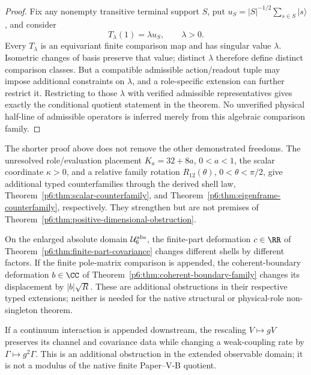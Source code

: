 \documentclass[12pt,a4paper]{article}
\newcommand{\Uabs}{\mathcal U_6^{\rm abs}}
\begin{document}
\begin{proof}
Fix any nonempty transitive terminal support \(S\), put
\(u_S=|S|^{-1/2}\sum_{s\in S}|s\rangle\), and consider
\[
T_\lambda(1)=\lambda u_S,
\qquad \lambda>0.
\]
Every \(T_\lambda\) is an equivariant finite comparison map and has
singular value \(\lambda\). Isometric changes of basis preserve that
value; distinct \(\lambda\) therefore define distinct comparison
classes. But a compatible admissible action/readout tuple may impose
additional constraints on \(\lambda\), and a role-specific extension
can further restrict it. Restricting to those \(\lambda\) with verified
admissible representatives gives exactly the conditional quotient statement
in the theorem. No unverified physical half-line of admissible operators is
inferred merely from this algebraic comparison family.
\end{proof}

\begin{corollary}
\label{p6:cor:additional-obstruction-witnesses}
The shorter proof above does not remove the other demonstrated freedoms.  The
unresolved role/evaluation placement
\(K_a=32+8a\), \(0<a<1\), the scalar coordinate \(\kappa>0\), and a relative
family rotation \(R_{12}(\theta)\), \(0<\theta<\pi/2\), give additional typed
counterfamilies through the derived shell law,
Theorem~\ref{p6:thm:scalar-counterfamily}, and
Theorem~\ref{p6:thm:eigenframe-counterfamily}, respectively.  They strengthen
but are not premises of Theorem~\ref{p6:thm:positive-dimensional-obstruction}.
\end{corollary}

\begin{corollary}
\label{p6:cor:absolute-comparison-obstruction}
On the enlarged absolute domain \(\Uabs\), the finite-part deformation
\(c\in\RR\) of Theorem~\ref{p6:thm:finite-part-covariance} changes different
shells by different factors.  If the finite pole-matrix comparison is
appended, the coherent-boundary deformation \(b\in\CC\) of
Theorem~\ref{p6:thm:coherent-boundary-family} changes its displacement by
\(|b|\sqrt R\).  These are additional obstructions in their respective
typed extensions; neither is needed for the native structural or physical-role
non-singleton theorem.
\end{corollary}

\begin{corollary}
\label{p6:cor:extended-observable-obstruction}
If a continuum interaction is appended downstream, the rescaling
\(V\mapsto gV\) preserves its channel and covariance data while changing a
weak-coupling rate by \(\Gamma\mapsto g^2\Gamma\).  This is an additional
obstruction in the extended observable domain; it is not a modulus of the
native finite Paper--V-B quotient.
\end{corollary}
\end{document}
